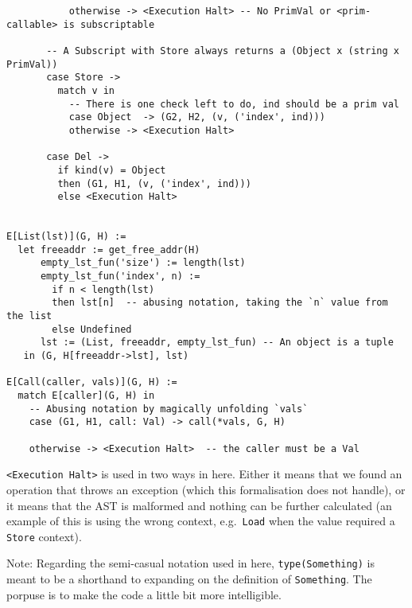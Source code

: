 \begin{verbatim}
           otherwise -> <Execution Halt> -- No PrimVal or <prim-callable> is subscriptable

       -- A Subscript with Store always returns a (Object x (string x PrimVal))
       case Store ->
         match v in
           -- There is one check left to do, ind should be a prim val
           case Object  -> (G2, H2, (v, ('index', ind)))
           otherwise -> <Execution Halt>

       case Del ->
         if kind(v) = Object
         then (G1, H1, (v, ('index', ind)))
         else <Execution Halt>


E[List(lst)](G, H) :=
  let freeaddr := get_free_addr(H)
      empty_lst_fun('size') := length(lst)
      empty_lst_fun('index', n) :=
        if n < length(lst)
        then lst[n]  -- abusing notation, taking the `n` value from the list
        else Undefined
      lst := (List, freeaddr, empty_lst_fun) -- An object is a tuple
   in (G, H[freeaddr->lst], lst)

E[Call(caller, vals)](G, H) :=
  match E[caller](G, H) in
    -- Abusing notation by magically unfolding `vals`
    case (G1, H1, call: Val) -> call(*vals, G, H)

    otherwise -> <Execution Halt>  -- the caller must be a Val
\end{verbatim}

\texttt{\textless{}Execution\ Halt\textgreater{}} is used in two ways in
here. Either it means that we found an operation that throws an
exception (which this formalisation does not handle), or it means that
the AST is malformed and nothing can be further calculated (an example
of this is using the wrong context, e.g.~\texttt{Load} when the value
required a \texttt{Store} context).

Note: Regarding the semi-casual notation used in here,
\texttt{type(Something)} is meant to be a shorthand to expanding on the
definition of \texttt{Something}. The porpuse is to make the code a
little bit more intelligible.

\iffalse

